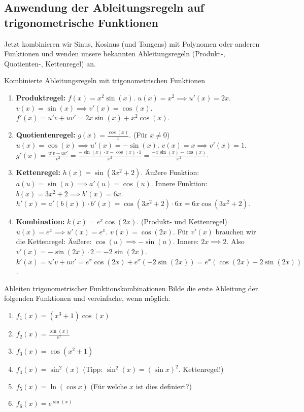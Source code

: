 \subsection{Anwendung der Ableitungsregeln auf trigonometrische Funktionen}
\label{subsec:ableitungsregeln_trig}

Jetzt kombinieren wir Sinus, Kosinus (und Tangens) mit Polynomen oder anderen Funktionen und wenden unsere bekannten Ableitungsregeln (Produkt-, Quotienten-, Kettenregel) an.

\begin{beispielumgebung}{Kombinierte Ableitungsregeln mit trigonometrischen Funktionen}
\begin{enumerate}
    \item \textbf{Produktregel:} $f(x) = x^2 \sin(x)$.
        $u(x)=x^2 \implies u'(x)=2x$.
        $v(x)=\sin(x) \implies v'(x)=\cos(x)$.
        $f'(x) = u'v + uv' = 2x \sin(x) + x^2 \cos(x)$.

    \item \textbf{Quotientenregel:} $g(x) = \frac{\cos(x)}{x}$. (Für $x \neq 0$)
        $u(x)=\cos(x) \implies u'(x)=-\sin(x)$.
        $v(x)=x \implies v'(x)=1$.
        $g'(x) = \frac{u'v - uv'}{v^2} = \frac{-\sin(x) \cdot x - \cos(x) \cdot 1}{x^2} = \frac{-x\sin(x) - \cos(x)}{x^2}$.

    \item \textbf{Kettenregel:} $h(x) = \sin(3x^2+2)$.
        Äußere Funktion: $a(u)=\sin(u) \implies a'(u)=\cos(u)$.
        Innere Funktion: $b(x)=3x^2+2 \implies b'(x)=6x$.
        $h'(x) = a'(b(x)) \cdot b'(x) = \cos(3x^2+2) \cdot 6x = 6x \cos(3x^2+2)$.

    \item \textbf{Kombination:} $k(x) = e^x \cos(2x)$. (Produkt- und Kettenregel)
        $u(x)=e^x \implies u'(x)=e^x$.
        $v(x)=\cos(2x)$. Für $v'(x)$ brauchen wir die Kettenregel:
            Äußere: $\cos(u) \implies -\sin(u)$. Innere: $2x \implies 2$. Also $v'(x) = -\sin(2x) \cdot 2 = -2\sin(2x)$.
        $k'(x) = u'v + uv' = e^x \cos(2x) + e^x (-2\sin(2x)) = e^x(\cos(2x) - 2\sin(2x))$.
\end{enumerate}
\end{beispielumgebung}

\begin{aufgabenumgebung}{Ableiten trigonometrischer Funktionskombinationen}
Bilde die erste Ableitung der folgenden Funktionen und vereinfache, wenn möglich.
\begin{enumerate}
    \item $f_1(x) = (x^3+1)\cos(x)$
    \item $f_2(x) = \frac{\sin(x)}{e^x}$
    \item $f_3(x) = \cos(x^2+1)$
    \item $f_4(x) = \sin^2(x)$ (Tipp: $\sin^2(x) = (\sin x)^2$. Kettenregel!)
    \item $f_5(x) = \ln(\cos x)$ (Für welche $x$ ist dies definiert?)
    \item $f_6(x) = e^{\sin(x)}$
\end{enumerate}
\end{aufgabenumgebung}

